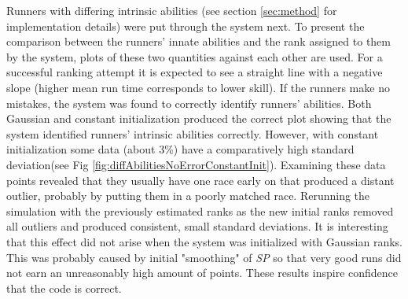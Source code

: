 Runners with differing intrinsic abilities (see section \ref{sec:method} for implementation details) were put through the system next. To present the comparison between the runners' innate abilities and the rank assigned to them by the system, plots of these two quantities against each other are used. For a successful ranking attempt it is expected to see a straight line with a negative slope (higher mean run time corresponds to lower skill). If the runners make no mistakes, the system was found to correctly identify runners' abilities. Both Gaussian and constant initialization produced the correct plot showing that the system identified runners' intrinsic abilities correctly. However, with constant initialization some data (about 3\%) have a comparatively high standard deviation(see Fig \ref{fig:diffAbilitiesNoErrorConstantInit}). Examining these data points revealed that they usually have one race early on that produced a distant outlier, probably by putting them in a poorly matched race. Rerunning the simulation with the previously estimated ranks as the new initial ranks removed all outliers and produced consistent, small standard deviations. It is interesting that this effect did not arise when the system was initialized with Gaussian ranks. This was probably caused by initial "smoothing" of \emph{SP} so that very good runs did not earn an unreasonably high amount of points. These results inspire confidence that the code is correct.
